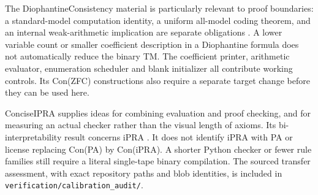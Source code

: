 \documentclass[11pt,letterpaper]{article}
\newcommand{\file}[1]{\nolinkurl{#1}}
\begin{document}
The DiophantineConsistency material is particularly relevant to proof
boundaries: a standard-model computation identity, a uniform all-model
coding theorem, and an internal weak-arithmetic implication are separate
obligations \cite{dio}. A lower variable count or smaller coefficient description in
a Diophantine formula does not automatically reduce the binary TM. The
coefficient printer, arithmetic evaluator, enumeration scheduler and blank
initializer all contribute working controls. Its Con(ZFC) constructions
also require a separate target change before they can be used here.

ConciseIPRA supplies ideas for combining evaluation and proof checking,
and for measuring an actual checker rather than the visual length of
axioms. Its bi-interpretability result concerns iPRA \cite{concise}. It does not identify
iPRA with PA or license replacing Con(PA) by Con(iPRA). A shorter Python
checker or fewer rule families still require a literal single-tape binary
compilation. The sourced transfer assessment, with exact repository paths
and blob identities, is included in \file{verification/calibration_audit/}.
\end{document}

